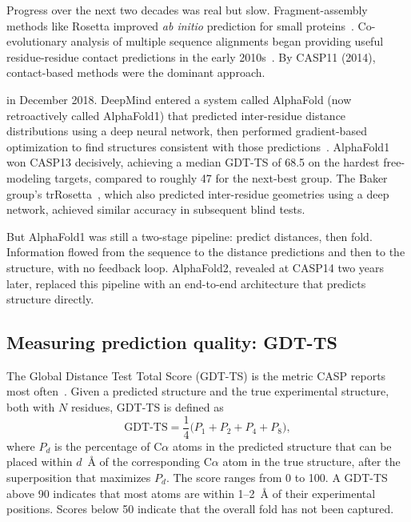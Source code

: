 Progress over the next two decades was real but slow.
Fragment-assembly methods like Rosetta improved \emph{ab initio} prediction for small proteins~\cite{rohl2004}.
Co-evolutionary analysis of multiple sequence alignments began providing useful residue-residue contact predictions in the early 2010s~\cite{marks2011,morcos2011,jones2012psicov}.
By CASP11 (2014), contact-based methods were the dominant approach.

 in December 2018.
DeepMind entered a system called AlphaFold (now retroactively called AlphaFold1) that predicted inter-residue distance distributions using a deep neural network, then performed gradient-based optimization to find structures consistent with those predictions~\cite{senior2020}.
AlphaFold1 won CASP13 decisively, achieving a median GDT-TS of 68.5 on the hardest free-modeling targets, compared to roughly 47 for the next-best group.
The Baker group's trRosetta~\cite{yang2020}, which also predicted inter-residue geometries using a deep network, achieved similar accuracy in subsequent blind tests.

But AlphaFold1 was still a two-stage pipeline: predict distances, then fold.
Information flowed from the sequence to the distance predictions and then to the structure, with no feedback loop.
AlphaFold2, revealed at CASP14 two years later, replaced this pipeline with an end-to-end architecture that predicts structure directly.

\subsection*{Measuring prediction quality: GDT-TS}
\label{sec:af2-gdtts}

The Global Distance Test Total Score (GDT-TS) is the metric CASP reports most often~\cite{zemla2003}.
Given a predicted structure and the true experimental structure, both with $N$ residues, GDT-TS is defined as
\begin{equation}
\label{eq:gdtts}
\text{GDT-TS} = \frac{1}{4}\bigl(P_1 + P_2 + P_4 + P_8\bigr),
\end{equation}
where $P_d$ is the percentage of C$\alpha$ atoms in the predicted structure that can be placed within $d$~\AA{} of the corresponding C$\alpha$ atom in the true structure, after the superposition that maximizes $P_d$.
The score ranges from 0 to 100.
A GDT-TS above 90 indicates that most atoms are within 1--2~\AA{} of their experimental positions.
Scores below 50 indicate that the overall fold has not been captured.


